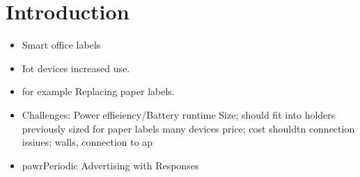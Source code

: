 \documentclass[11pt]{report}
\begin{document}
\begin{acronym}
\end{acronym}

\section*{Introduction}

\begin{itemize}
    \item Smart office labels
    \item Iot devices increased use. 
    \item for example Replacing paper labels.
    \item Challenges:
    \subitem Power effieiency/Battery runtime
    \subitem Size; should fit into holders previously sized for paper labels
    \subitem many devices
    \subsubitem price; cost shouldtn
    \subsubitem connection issiues; walls, connection to ap
    \item pawrPeriodic Advertising with Responses
\end{itemize}
\end{document}
